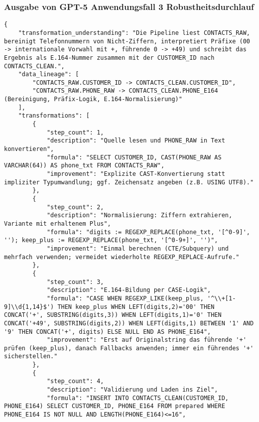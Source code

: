 \subsubsection{Ausgabe von GPT-5 Anwendungsfall 3 Robustheitsdurchlauf}\label{anhang:subsubsec:gpt_case3_prompt3}
\begin{lstlisting}[caption={Ausgabe: GPT-5 Anwendungsfall 3 Robustheitsdurchlauf},label={gpt_case3_prompt3}]
{
    "transformation_understanding": "Die Pipeline liest CONTACTS_RAW, bereinigt Telefonnummern von Nicht-Ziffern, interpretiert Präfixe (00 -> internationale Vorwahl mit +, führende 0 -> +49) und schreibt das Ergebnis als E.164-Nummer zusammen mit der CUSTOMER_ID nach CONTACTS_CLEAN.",
    "data_lineage": [
        "CONTACTS_RAW.CUSTOMER_ID -> CONTACTS_CLEAN.CUSTOMER_ID",
        "CONTACTS_RAW.PHONE_RAW -> CONTACTS_CLEAN.PHONE_E164 (Bereinigung, Präfix-Logik, E.164-Normalisierung)"
    ],
    "transformations": [
        {
            "step_count": 1,
            "description": "Quelle lesen und PHONE_RAW in Text konvertieren",
            "formula": "SELECT CUSTOMER_ID, CAST(PHONE_RAW AS VARCHAR(64)) AS phone_txt FROM CONTACTS_RAW",
            "improvement": "Explizite CAST-Konvertierung statt impliziter Typumwandlung; ggf. Zeichensatz angeben (z.B. USING UTF8)."
        },
        {
            "step_count": 2,
            "description": "Normalisierung: Ziffern extrahieren, Variante mit erhaltenem Plus",
            "formula": "digits := REGEXP_REPLACE(phone_txt, '[^0-9]', ''); keep_plus := REGEXP_REPLACE(phone_txt, '[^0-9+]', '')",
            "improvement": "Einmal berechnen (CTE/Subquery) und mehrfach verwenden; vermeidet wiederholte REGEXP_REPLACE-Aufrufe."
        },
        {
            "step_count": 3,
            "description": "E.164-Bildung per CASE-Logik",
            "formula": "CASE WHEN REGEXP_LIKE(keep_plus, '^\\+[1-9]\\d{1,14}$') THEN keep_plus WHEN LEFT(digits,2)='00' THEN CONCAT('+', SUBSTRING(digits,3)) WHEN LEFT(digits,1)='0' THEN CONCAT('+49', SUBSTRING(digits,2)) WHEN LEFT(digits,1) BETWEEN '1' AND '9' THEN CONCAT('+', digits) ELSE NULL END AS PHONE_E164",
            "improvement": "Erst auf Originalstring das führende '+' prüfen (keep_plus), danach Fallbacks anwenden; immer ein führendes '+' sicherstellen."
        },
        {
            "step_count": 4,
            "description": "Validierung und Laden ins Ziel",
            "formula": "INSERT INTO CONTACTS_CLEAN(CUSTOMER_ID, PHONE_E164) SELECT CUSTOMER_ID, PHONE_E164 FROM prepared WHERE PHONE_E164 IS NOT NULL AND LENGTH(PHONE_E164)<=16",

\end{lstlisting}

